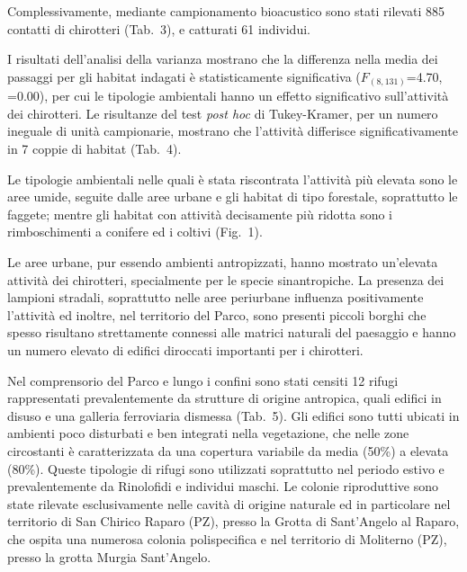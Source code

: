 \begin{multicols}{2}
Complessivamente, mediante campionamento bioacustico sono stati rilevati 885 contatti di chirotteri (Tab.~3), e catturati 61 individui.

I risultati dell’analisi della varianza mostrano che la differenza nella media dei passaggi per gli habitat indagati è statisticamente significativa ($F_{(8,131)}$=4.70, \prob{}=0.00), per cui le tipologie ambientali hanno un effetto significativo sull’attività dei chirotteri. Le risultanze del test \textit{post hoc} di Tukey-Kramer, per un numero ineguale di unità campionarie, mostrano che l’attività differisce significativamente in 7 coppie di habitat (Tab.~4).

Le tipologie ambientali nelle quali è stata riscontrata l’attività più elevata sono le aree umide, seguite dalle aree urbane e gli habitat di tipo forestale, soprattutto le faggete; mentre gli habitat con attività decisamente più ridotta sono i rimboschimenti a conifere ed i coltivi (Fig.~1).
 
Le aree urbane, pur essendo ambienti antropizzati, hanno mostrato un’elevata attività dei chirotteri, specialmente per le specie sinantropiche. La presenza dei lampioni stradali, soprattutto nelle aree periurbane influenza positivamente l’attività ed inoltre, nel territorio del Parco, sono presenti piccoli borghi che spesso risultano strettamente connessi alle matrici naturali del paesaggio e hanno un numero elevato di edifici diroccati importanti per i chirotteri. 

Nel comprensorio del Parco e lungo i confini sono stati censiti 12 rifugi rappresentati prevalentemente da strutture di origine antropica, quali edifici in disuso e una galleria ferroviaria dismessa (Tab.~5). Gli edifici sono tutti ubicati in ambienti poco disturbati e ben integrati nella vegetazione, che nelle zone circostanti è caratterizzata da una copertura variabile da media (50\%) a elevata (80\%). Queste tipologie di rifugi sono utilizzati soprattutto nel periodo estivo e prevalentemente da Rinolofidi e individui maschi. Le colonie riproduttive sono state rilevate esclusivamente nelle cavità di origine naturale ed in particolare nel territorio di San Chirico Raparo (PZ), presso la Grotta di Sant’Angelo al Raparo, che ospita una numerosa colonia polispecifica e nel territorio di Moliterno (PZ), presso la grotta Murgia Sant’Angelo. 


\end{multicols}
